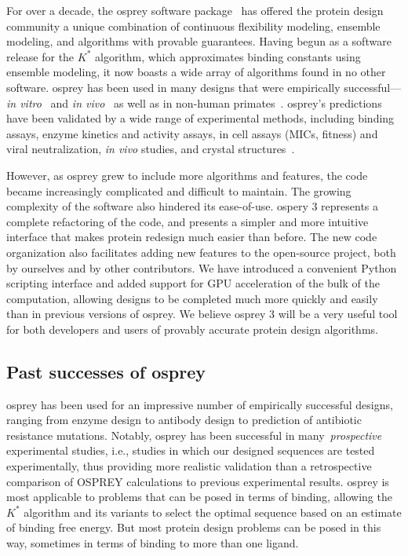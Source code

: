 For over a decade, the {\sc osprey} software package~\cite{OSPREY,minDEE,OSPREY_MIE} has offered the protein design community a unique combination of continuous flexibility modeling, ensemble modeling, and algorithms with provable guarantees.  Having begun as a software release for the $K^*$ algorithm, which approximates binding constants using ensemble modeling, it now boasts a wide array of algorithms found in no other software.  {\sc osprey} has been used in many designs that were empirically successful---\textit{in vitro}~\cite{VRC07_enhance,CFTR,runx1_cbfb,GrsA-LeuA,DHFR-PNAS,GrsA-TyrA,specific_probes} and \textit{in vivo}~\cite{VRC07_enhance,CFTR,runx1_cbfb,DHFR-PNAS} as well as in non-human primates~\cite{VRC07_enhance}.  {\sc osprey}'s predictions have been validated by a wide range of experimental methods, including binding assays, enzyme kinetics and activity assays, in cell assays (MICs, fitness) and viral neutralization, {\em in vivo} studies, and crystal structures~\cite{DHFR-PNAS2, VRC07_enhance}.    

However, as {\sc osprey} grew to include more algorithms and features, the code became increasingly complicated and difficult to maintain.  The growing complexity of the software also hindered its ease-of-use. {\sc ospery} 3 represents a complete refactoring of the code, and presents a simpler and more intuitive interface that makes protein redesign much easier than before. The new code organization also facilitates adding new features to the open-source project, both by ourselves and by other contributors.  We have introduced a convenient Python scripting interface and added support for GPU acceleration of the bulk of the computation, allowing designs to be completed much more quickly and easily than in previous versions of {\sc osprey}.  We believe {\sc osprey} 3 will be a very useful tool for both developers and users of provably accurate protein design algorithms.  

\subsection{Past successes of {\sc osprey}}

{\sc osprey} has been used for an impressive number of empirically successful designs, ranging from enzyme design to antibody design to prediction of antibiotic resistance mutations.  Notably, {\sc osprey} has been successful in many~\textit{prospective} experimental studies, i.e., studies in which our designed sequences are tested experimentally, thus providing more realistic validation than a retrospective comparison of OSPREY calculations to previous experimental results.  {\sc osprey} is most applicable to problems that can be posed in terms of binding, allowing the $K^*$ algorithm and its variants to select the optimal sequence based on an estimate of binding free energy.  But most protein design problems can be posed in this way, sometimes in terms of binding to more than one ligand.  

